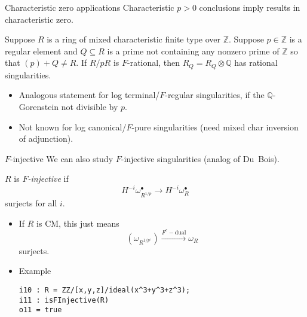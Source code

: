 \documentclass[xcolor=dvipsnames]{beamer}
\newcommand{\memph}[1]{{\color{Red}\emph{#1}}}
\newcommand{\bQ}{\mathbb{Q}}
\newcommand{\bZ}{\mathbb{Z}}
\newcommand{\mydot}{\bullet}
\theoremstyle{remark}
\begin{document}
\begin{frame}[c]{Characteristic zero applications}
    Characteristic $p > 0$ conclusions imply results in characteristic zero.
    \begin{theorem}[Ma-{$\bullet$}]
        Suppose $R$ is a ring of mixed characteristic finite type over $\bZ$.  Suppose $p \in \bZ$ is a regular element and $Q \subseteq R$ is a prime not containing any nonzero prime of $\bZ$ so that $(p) + Q \neq R$.
        \vskip 9pt
        If $R/pR$ is $F$-rational, then $R_Q = R_Q \otimes \bQ$ has rational singularities.
    \end{theorem}
    \begin{itemize}
    \item<2->Analogous statement for log terminal/$F$-regular singularities, if the $\bQ$-Gorenstein not divisible by $p$.
    \item<3->Not known for log canonical/$F$-pure singularities (need mixed char inversion of adjunction).
    \end{itemize}
\end{frame}

\begin{frame}[fragile]{$F$-injective}
    We can also study $F$-injective singularities (analog of Du~Bois).

        \begin{definition}
        $R$ is \memph{$F$-injective} if
        \[
        H^{-i} \omega_{R^{1/p}}^{\mydot} \to H^{-i} \omega_{R}^{\mydot}
        \]
        surjects for all $i$.
        \end{definition}
        \begin{itemize}
        \item<2->  If $R$ is CM, this just means
        \[
            (\omega_{R^{1/p^e}}) \xrightarrow{F^e-\mathrm{dual}} \omega_R
        \]
        surjects.
        \item<3->  Example
        \begin{verbatim}
i10 : R = ZZ/[x,y,z]/ideal(x^3+y^3+z^3);
i11 : isFInjective(R)
o11 = true
        \end{verbatim}
    \end{itemize}
\end{frame}
\end{document}
